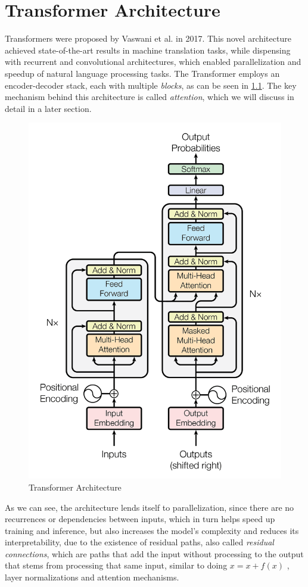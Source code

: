 \chapter{Transformer Architecture} \label{chapter:3}
Transformers \cite{attention_is_all_you_need} were proposed by Vaswani et al. in 2017. This novel architecture achieved state-of-the-art results in machine translation tasks, while dispensing with recurrent and convolutional architectures, which enabled parallelization and speedup of natural language processing tasks. The Transformer employs an encoder-decoder stack, each with multiple \emph{blocks}, as can be seen in \ref{fig:transformer}. The key mechanism behind this architecture is called \emph{attention}, which we will discuss in detail in a later section.

\begin{figure}[h]
    \centering
    \includegraphics[width=0.6\linewidth]{figs/transformer.png}
    \caption{Transformer Architecture \cite{attention_is_all_you_need}}
    \label{fig:transformer}
\end{figure}

As we can see, the architecture lends itself to parallelization, since there are no recurrences or dependencies between inputs, which in turn helps speed up training and inference, but also increases the model's complexity and reduces its interpretability, due to the existence of residual paths, also called \emph{residual connections}, which are paths that add the input without processing to the output that stems from processing that same input, similar to doing $x = x + f(x)$ , layer normalizations and attention mechanisms.

